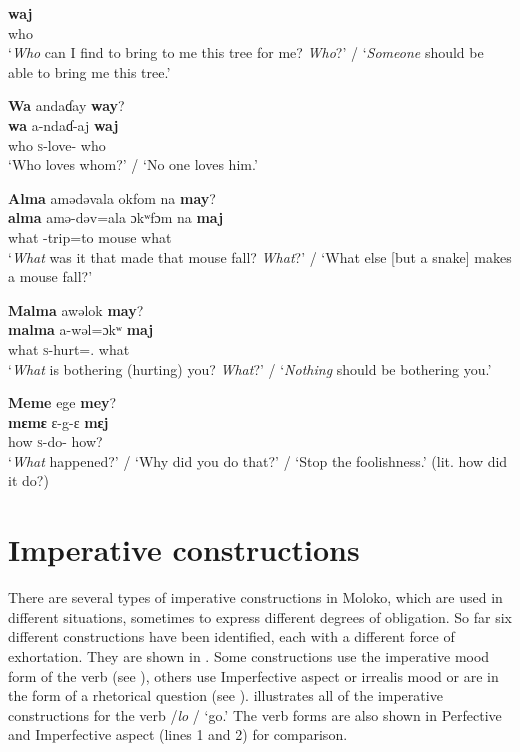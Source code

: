       \medskip
\gll \textbf{waj}\\
     who\\ 
\glt  ‘\textit{Who} can I find to bring to me this tree for me?  \textit{Who}?’ / ‘\textit{Someone} should be able to bring me this tree.’
\z 

\ea \label{ex:10:103}
\textbf{Wa}  andaɗay  \textbf{way}?\\
\gll  \textbf{wa}    a-ndaɗ-aj   \textbf{waj}\\
      who    \textsc{s}-love{}-{\CL}  who\\
\glt  ‘Who loves whom?' / ‘No one loves him.'
\z 

\ea \label{ex:10:104}
\textbf{Alma}  amədəvala  okfom  na  \textbf{may}?\\
\gll  \textbf{alma}  amə-dəv=ala    ɔkʷfɔm  na  \textbf{maj}\\
      what  {\DEP}-trip=to    mouse  {\PSP}  what\\
\glt  ‘\textit{What} was it that made that mouse fall? \textit{What}?' / ‘What else [but a snake] makes a mouse fall?’
\z 

\ea \label{ex:10:105}
\textbf{Malma}  awəlok{  }\textbf{may}?\\
\gll  \textbf{malma}   a-wəl=ɔkʷ   \textbf{maj}\\
      what  \textsc{s}-hurt={\twoS}.{\IO}  what\\
\glt  ‘\textit{What} is bothering (hurting) you? \textit{What}?’ / ‘\textit{Nothing} should be bothering you.’
\z 

\ea \label{ex:10:106}
\textbf{Meme}  ege  \textbf{mey}?\\
\gll  \textbf{mɛmɛ}   ɛ{}-g-ɛ     \textbf{mɛj}\\
      how    \textsc{s}-do-{\CL}  how?\\
\glt  ‘\textit{What} happened?’ / ‘Why did you do that?’ / ‘Stop the foolishness.’ (lit. how did it do?)
\z 

\section{Imperative constructions}\label{sec:10.4}
\hypertarget{RefHeading1213101525720847}{}
There are several types of imperative constructions in Moloko, which are used in different situations, sometimes to express different degrees of obligation.  So far six different constructions have been identified, each with a different force of exhortation. They are shown in . Some constructions use the imperative mood form of the verb (see ), others use Imperfective aspect or irrealis mood or are in the form of a rhetorical question (see ).  illustrates all of the imperative constructions for the verb /\textit{lo} / ‘go.’ The verb forms are also shown in Perfective and Imperfective aspect (lines 1 and 2) for comparison.

